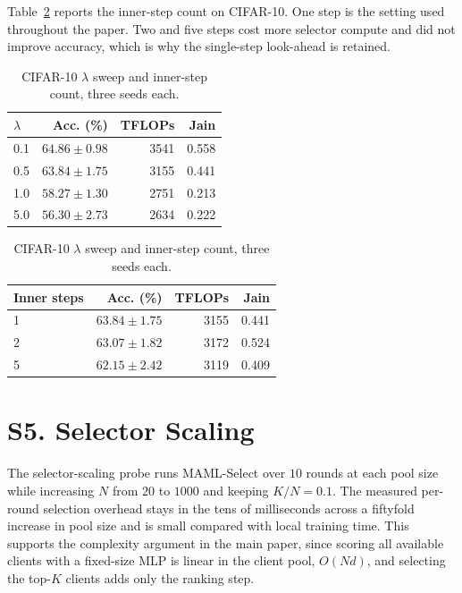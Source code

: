 \documentclass[10pt]{article}
\begin{document}
Table~\ref{tab:supp_inner} reports the inner-step count on CIFAR-10.  One step
is the setting used throughout the paper.  Two and five steps cost more
selector compute and did not improve accuracy, which is why the single-step
look-ahead is retained.

\begin{table}[!ht]
\centering
\caption{CIFAR-10 $\lambda$ sweep and inner-step count, three seeds each.}
\label{tab:supp_inner}
\small
\begin{minipage}{0.48\textwidth}
\centering
\begin{tabular}{@{}lrrr@{}}
\toprule
$\lambda$ & Acc. (\%) & TFLOPs & Jain \\
\midrule
0.1 & $64.86 \pm 0.98$ & 3541 & 0.558 \\
0.5 & $63.84 \pm 1.75$ & 3155 & 0.441 \\
1.0 & $58.27 \pm 1.30$ & 2751 & 0.213 \\
5.0 & $56.30 \pm 2.73$ & 2634 & 0.222 \\
\bottomrule
\end{tabular}
\end{minipage}
\hfill
\begin{minipage}{0.48\textwidth}
\centering
\begin{tabular}{@{}lrrr@{}}
\toprule
Inner steps & Acc. (\%) & TFLOPs & Jain \\
\midrule
1 & $63.84 \pm 1.75$ & 3155 & 0.441 \\
2 & $63.07 \pm 1.82$ & 3172 & 0.524 \\
5 & $62.15 \pm 2.42$ & 3119 & 0.409 \\
\bottomrule
\end{tabular}
\end{minipage}
\end{table}

\section*{S5. Selector Scaling}

The selector-scaling probe runs MAML-Select over $10$ rounds at each pool size while increasing $N$ from $20$ to $1000$ and keeping $K/N=0.1$.  The measured per-round selection overhead stays in the tens of milliseconds across a fiftyfold increase in pool size and is small compared with local training time.  This supports the complexity argument in the main paper, since scoring all available clients with a fixed-size MLP is linear in the client pool, $O(Nd)$, and selecting the top-$K$ clients adds only the ranking step.
\end{document}

